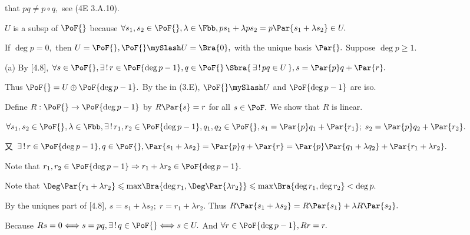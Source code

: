\NOTICE that $pq\neq p\circ q,$ see (4E 3.A.10).\par\quad
$U$ is a subsp of $\PoF{}$ because $\forall s_1,s_2\in\PoF{},\lambda\in\Fbb,ps_1+\lambda ps_2=p\Par{s_1+\lambda s_2}\in U.$\par\vspace{3pt}\quad
If $\deg p=0,$ then $U=\PoF{},\PoF{}\mySlash U=\Bra{0},$ with the unique basis $\Par{}.$ Suppose $\deg p\geqslant 1.$\par\vspace{6pt}\quad
(a) By [4.8], $\forall s\in\PoF{},\exists\,!\,r\in\PoF{\deg p-1},q\in\PoF{}\,\Sbra{\,\exists\,!\,pq\in U\,},s=\Par{p}q+\Par{r}.$\vspace{2.5pt}\par\quad\Ha
Thus $\PoF{}=U\oplus\PoF{\deg p-1}.$ By the \NOTEFOR\;[3.91] in (3.E), $\PoF{}\mySlash U$ and $\PoF{\deg p-1}$ are iso.\par\vspace{4.5pt}\quad\Ha
\Or Define $R:\PoF{}\rightarrow\PoF{\deg p-1}$ by $R\Par{s}=r$ for all $s\in\PoF.$ We show that $R$ is linear.\vspace{2pt}\par\quad\Ha
$\forall s_1,s_2\in\PoF{},\lambda\in\Fbb,\exists\,!\,r_1,r_2\in\PoF{\deg p-1},q_1,q_2\in\PoF{},s_1=\Par{p}q_1+\Par{r_1};\;s_2=\Par{p}q_2+\Par{r_2}.$\vspace{2pt}\par\quad\Ha
又 $\exists\,!\,r\in\PoF{\deg p-1},q\in\PoF{},\Par{s_1+\lambda s_2}=\Par{p}q+\Par{r}=\Par{p}\Par{q_1+\lambda q_2}+\Par{r_1+\lambda r_2}.$\vspace{2pt}\par\quad\Ha
Note that $r_1,r_2\in\PoF{\deg p-1}\Rightarrow r_1+\lambda r_2\in\PoF{\deg p-1}.$\vspace{2pt}\par\quad\Ha
\OR Note that $\Deg\Par{r_1+\lambda r_2}\leqslant\max\!\Bra{\deg r_1,\Deg\Par{\lambda r_2}}\leqslant\max\!\Bra{\deg r_1,\deg r_2}<\deg p.$\vspace{2pt}\par\quad\Hb
By the uniqnes part of [4.8], $s=s_1+\lambda s_2;\;r=r_1+\lambda r_2.$
Thus $R\Par{s_1+\lambda s_2}=R\Par{s_1}+\lambda R\Par{s_2}.$\vspace{6pt}\par\quad\Ha
Because $Rs=0\Longleftrightarrow s=pq,\exists\,!\,q\in\PoF{}\Longleftrightarrow s\in U.$ And $\forall r\in\PoF{\deg p-1},Rr=r.$\vspace{2pt}\par\quad\Ha
